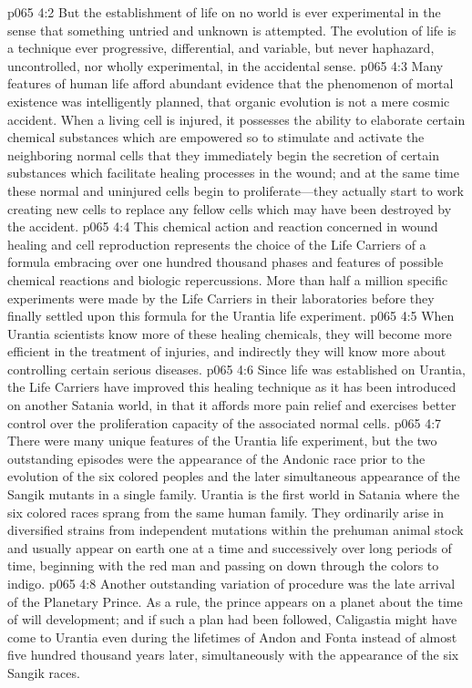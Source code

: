\vs p065 4:2 But the establishment of life on no world is ever experimental in the sense that something untried and unknown is attempted. The evolution of life is a technique ever progressive, differential, and variable, but never haphazard, uncontrolled, nor wholly experimental, in the accidental sense.
\pc \vs p065 4:3 Many features of human life afford abundant evidence that the phenomenon of mortal existence was intelligently planned, that organic evolution is not a mere cosmic accident. When a living cell is injured, it possesses the ability to elaborate certain chemical substances which are empowered so to stimulate and activate the neighboring normal cells that they immediately begin the secretion of certain substances which facilitate healing processes in the wound; and at the same time these normal and uninjured cells begin to proliferate---they actually start to work creating new cells to replace any fellow cells which may have been destroyed by the accident.
\vs p065 4:4 This chemical action and reaction concerned in wound healing and cell reproduction represents the choice of the Life Carriers of a formula embracing over one hundred thousand phases and features of possible chemical reactions and biologic repercussions. More than half a million specific experiments were made by the Life Carriers in their laboratories before they finally settled upon this formula for the Urantia life experiment.
\vs p065 4:5 When Urantia scientists know more of these healing chemicals, they will become more efficient in the treatment of injuries, and indirectly they will know more about controlling certain serious diseases.
\vs p065 4:6 Since life was established on Urantia, the Life Carriers have improved this healing technique as it has been introduced on another Satania world, in that it affords more pain relief and exercises better control over the proliferation capacity of the associated normal cells.
\pc \vs p065 4:7 There were many unique features of the Urantia life experiment, but the two outstanding episodes were the appearance of the Andonic race prior to the evolution of the six colored peoples and the later simultaneous appearance of the Sangik mutants in a single family. Urantia is the first world in Satania where the six colored races sprang from the same human family. They ordinarily arise in diversified strains from independent mutations within the prehuman animal stock and usually appear on earth one at a time and successively over long periods of time, beginning with the red man and passing on down through the colors to indigo.
\vs p065 4:8 Another outstanding variation of procedure was the late arrival of the Planetary Prince. As a rule, the prince appears on a planet about the time of will development; and if such a plan had been followed, Caligastia might have come to Urantia even during the lifetimes of Andon and Fonta instead of almost five hundred thousand years later, simultaneously with the appearance of the six Sangik races.
